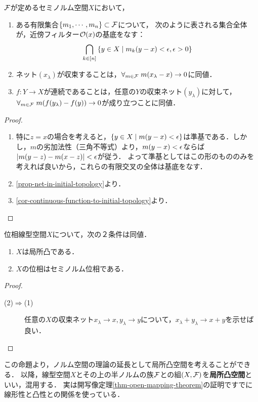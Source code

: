 \documentclass[uplatex,dvipdfmx]{jsreport}
\begin{document}
\begin{lemma}[セミノルム位相の性質]
    $\mathcal{F}$が定めるセミノルム空間$X$において，
    \begin{enumerate}
        \item ある有限集合$\{m_1,\cdots,m_n\}\subset\mathcal{F}$について，
        次のように表される集合全体が，近傍フィルター$\mathcal{O}(x)$の基底をなす：
        \[\bigcap_{k\in[n]}\left\{y\in X\mid m_k(y-x)<\epsilon,\epsilon>0\right\}\]
        \item ネット$(x_\lambda)$が収束することは，$\forall_{m\in\mathcal{F}}\;m(x_\lambda-x)\to0$に同値．
        \item $f:Y\to X$が連続であることは，任意の$Y$の収束ネット$(y_\lambda)$に対して，$\forall_{m\in\mathcal{F}}\;m(f(y_\lambda)-f(y))\to 0$が成り立つことに同値．
    \end{enumerate}
\end{lemma}
\begin{proof}\mbox{}
    \begin{enumerate}
        \item 特に$z=x$の場合を考えると，$\{y\in X\mid m(y-x)<\epsilon\}$は準基である．しかし，$m$の劣加法性（三角不等式）より，$m(y-x)<\epsilon$ならば$\lvert m(y-z)-m(x-z)\rvert<\epsilon$が従う．
        よって準基としてはこの形のもののみを考えれば良いから，これらの有限交叉の全体は基底をなす．
        \item \ref{prop-net-in-initial-topology}より．
        \item \ref{cor-continuous-function-to-initial-topology}より．
    \end{enumerate}
\end{proof}

\begin{proposition}[局所凸性の特徴付け]\label{prop-characterization-of-locally-convex-spaces}
    位相線型空間$X$について，次の２条件は同値．
    \begin{enumerate}
        \item $X$は局所凸である．
        \item $X$の位相はセミノルム位相である．
    \end{enumerate}
\end{proposition}
\begin{proof}\mbox{}
    \begin{description}
        \item[(2)$\Rightarrow$(1)] 任意の$X$の収束ネット$x_\lambda\to x,y_\lambda\to y$について，$x_\lambda+y_\lambda\to x+y$を示せば良い．
    \end{description}
\end{proof}
\begin{remarks}
    この命題より，ノルム空間の理論の延長として局所凸空間を考えることができる．
    以降，線型空間$X$とその上の半ノルムの族$\mathcal{F}$との組$(X,\mathcal{F})$を\textbf{局所凸空間}といい，混用する．
    実は開写像定理\ref{thm-open-mapping-theorem}の証明ですでに線形性と凸性との関係を使っている．
\end{remarks}
\end{document}
